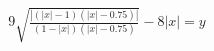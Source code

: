\documentclass[preview]{standalone}
\begin{document}
\begin{align*}
9 \sqrt{\frac{|(|x|-1)(|x|-0.75)|}{(1-|x|)(|x|-0.75)}} - 8|x| = y
\end{align*}
\end{document}
